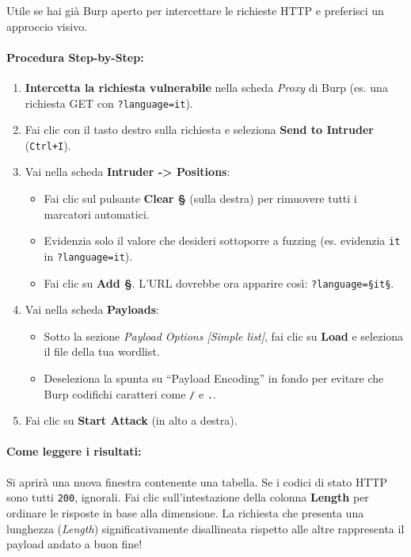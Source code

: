 \documentclass[12pt,a4paper]{report}
\begin{document}
	Utile se hai già Burp aperto per intercettare le richieste HTTP e preferisci un approccio visivo.
	
	\paragraph{Procedura Step-by-Step:}
	\begin{enumerate}
		\item \textbf{Intercetta la richiesta vulnerabile} nella scheda \textit{Proxy} di Burp (es. una richiesta GET con \texttt{?language=it}).
		\item Fai clic con il tasto destro sulla richiesta e seleziona \textbf{Send to Intruder} (\texttt{Ctrl+I}).
		\item Vai nella scheda \textbf{Intruder -> Positions}:
		\begin{itemize}
			\item Fai clic sul pulsante \textbf{Clear \S} (sulla destra) per rimuovere tutti i marcatori automatici.
			\item Evidenzia solo il valore che desideri sottoporre a fuzzing (es. evidenzia \texttt{it} in \texttt{?language=it}).
			\item Fai clic su \textbf{Add \S}. L'URL dovrebbe ora apparire così: \texttt{?language=\S{}it\S{}}.
		\end{itemize}
		\item Vai nella scheda \textbf{Payloads}:
		\begin{itemize}
			\item Sotto la sezione \textit{Payload Options [Simple list]}, fai clic su \textbf{Load} e seleziona il file della tua wordlist.
			\item Deseleziona la spunta su "`Payload Encoding"' in fondo per evitare che Burp codifichi caratteri come \texttt{/} e \texttt{.}.
		\end{itemize}
		\item Fai clic su \textbf{Start Attack} (in alto a destra).
	\end{enumerate}
	
	\paragraph{Come leggere i risultati:}
	Si aprirà una nuova finestra contenente una tabella. Se i codici di stato HTTP sono tutti \texttt{200}, ignorali. Fai clic sull'intestazione della colonna \textbf{Length} per ordinare le risposte in base alla dimensione. La richiesta che presenta una lunghezza (\textit{Length}) significativamente disallineata rispetto alle altre rappresenta il payload andato a buon fine!
	
\end{document}
